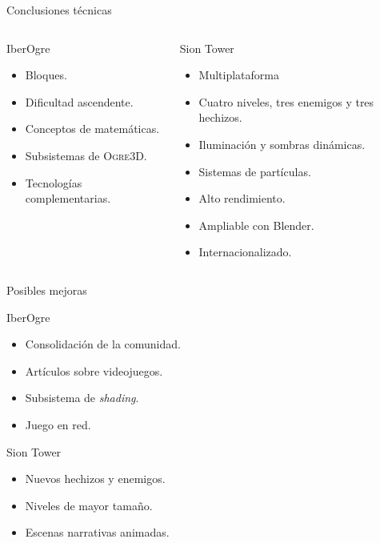 \documentclass[green]{beamer}
\begin{document}
\begin{frame}{Conclusiones técnicas}
    \begin{columns}[t]
    \column{150pt}
    \begin{block}{IberOgre}
	\begin{itemize}
	    \item Bloques.
	    \item Dificultad ascendente.
	    \item Conceptos de matemáticas.
	    \item Subsistemas de \textsc{Ogre3D}.
	    \item Tecnologías complementarias.
	\end{itemize}
    \end{block}
    \column{150pt}
    \begin{block}{Sion Tower}
	\begin{itemize}
	    \item Multiplataforma
	    \item Cuatro niveles, tres enemigos y tres hechizos.
	    \item Iluminación y sombras dinámicas.
	    \item Sistemas de partículas.
	    \item Alto rendimiento.
	    \item Ampliable con Blender.
	    \item Internacionalizado.
	\end{itemize}
    \end{block}
    \end{columns}
\end{frame}

\begin{frame}{Posibles mejoras}
    \begin{block}{IberOgre}
	\begin{itemize}
	    \item Consolidación de la comunidad.
	    \item Artículos sobre videojuegos.
	    \item Subsistema de \textit{shading}.
	    \item Juego en red.
	\end{itemize}
    \end{block}
    
    \begin{block}{Sion Tower}
	\begin{itemize}
	    \item Nuevos hechizos y enemigos.
	    \item Niveles de mayor tamaño.
	    \item Escenas narrativas animadas.
	\end{itemize}
    \end{block}
\end{frame}
\end{document}
